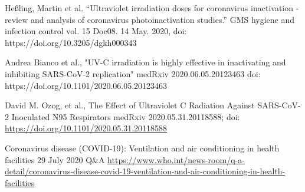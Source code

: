\documentclass[12pt]{scrartcl}
\begin{document}
\begin{thebibliography}{9}

   Heßling, Martin et al. 
   “Ultraviolet irradiation doses for coronavirus inactivation - review and analysis of coronavirus photoinactivation studies.”
   GMS hygiene and infection control vol. 15 Doc08. 
   14 May. 2020, 
   doi: https://doi.org/10.3205/dgkh000343
   
  Andrea Bianco et al.,
  "UV-C irradiation is highly effective in inactivating and inhibiting SARS-CoV-2 replication"
  medRxiv 2020.06.05.20123463
  doi: https://doi.org/10.1101/2020.06.05.20123463 
  
  David M. Ozog, et al.,
  The Effect of Ultraviolet C Radiation Against SARS-CoV-2 Inoculated N95 Respirators
  medRxiv 2020.05.31.20118588; doi: \url{https://doi.org/10.1101/2020.05.31.20118588}

  Coronavirus disease (COVID-19): Ventilation and air conditioning in health facilities
  29 July 2020  Q\&A
  \url{https://www.who.int/news-room/q-a-detail/coronavirus-disease-covid-19-ventilation-and-air-conditioning-in-health-facilities}

\end{thebibliography}
\end{document}

